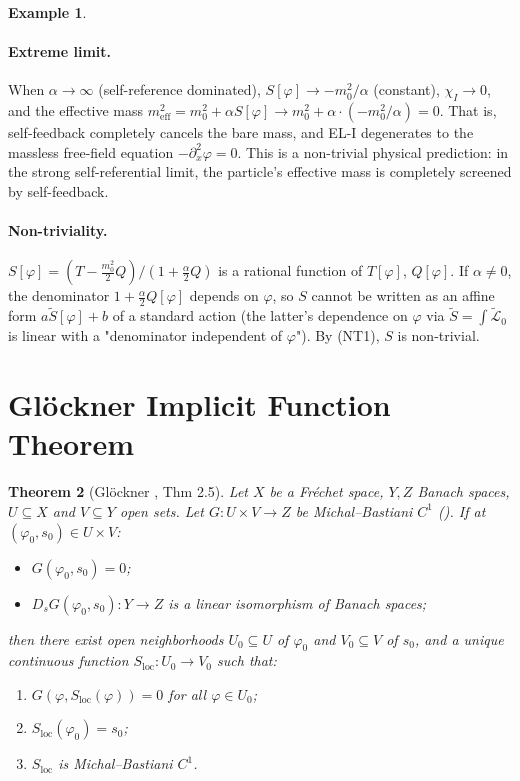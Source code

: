 \documentclass[12pt,letterpaper]{article}
\newtheorem{theorem}{Theorem}[section]
\theoremstyle{definition}
\newtheorem{example}[theorem]{Example}
\newcommand{\mL}{\mathcal{L}}
\begin{document}
\begin{example}
\paragraph{Extreme limit.}
When $\alpha \to \infty$ (self-reference dominated), $S[\varphi] \to -m_0^2/\alpha$ (constant), $\chi_I \to 0$, and the effective mass $m_{\mathrm{eff}}^2 = m_0^2 + \alpha S[\varphi] \to m_0^2 + \alpha \cdot (-m_0^2/\alpha) = 0$. That is, self-feedback completely cancels the bare mass, and EL-I degenerates to the massless free-field equation $-\partial_x^2 \varphi = 0$. This is a non-trivial physical prediction: in the strong self-referential limit, the particle's effective mass is completely screened by self-feedback.

\paragraph{Non-triviality.}
$S[\varphi] = (T - \frac{m_0^2}{2}Q)/(1 + \frac{\alpha}{2}Q)$ is a rational function of $T[\varphi]$, $Q[\varphi]$. If $\alpha \neq 0$, the denominator $1 + \frac{\alpha}{2}Q[\varphi]$ depends on $\varphi$, so $S$ cannot be written as an affine form $a\tilde{S}[\varphi] + b$ of a standard action (the latter's dependence on $\varphi$ via $\tilde{S} = \int\tilde{\mL}_0$ is linear with a "denominator independent of $\varphi$"). By  (NT1), $S$ is non-trivial.
\end{example}

\section{Gl\"ockner Implicit Function Theorem}
\label{sec:glockner-full}

\begin{theorem}[Gl\"ockner {\cite{Glockner2006}, Thm 2.5}]
\label{thm:glockner-full}
Let $X$ be a Fr\'echet space, $Y, Z$ Banach spaces, $U \subseteq X$ and $V \subseteq Y$ open sets. Let $G: U \times V \to Z$ be Michal--Bastiani $C^1$ (). If at $(\varphi_0, s_0) \in U \times V$:
\begin{itemize}
\item[(IFT-1)] $G(\varphi_0, s_0) = 0$;
\item[(IFT-2)] $D_s G(\varphi_0, s_0): Y \to Z$ is a linear isomorphism of Banach spaces;
\end{itemize}
then there exist open neighborhoods $U_0 \subseteq U$ of $\varphi_0$ and $V_0 \subseteq V$ of $s_0$, and a unique continuous function $S_{\mathrm{loc}}: U_0 \to V_0$ such that:
\begin{enumerate}
\item $G(\varphi, S_{\mathrm{loc}}(\varphi)) = 0$ for all $\varphi \in U_0$;
\item $S_{\mathrm{loc}}(\varphi_0) = s_0$;
\item $S_{\mathrm{loc}}$ is Michal--Bastiani $C^1$.
\end{enumerate}
\end{theorem}
\end{document}
